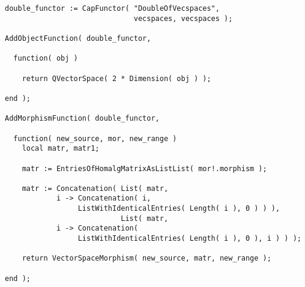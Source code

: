 \begin{small}
\begin{Verbatim}[frame=single]
double_functor := CapFunctor( "DoubleOfVecspaces", 
                              vecspaces, vecspaces );

AddObjectFunction( double_functor,
                   
  function( obj )
    
    return QVectorSpace( 2 * Dimension( obj ) );
    
end );

AddMorphismFunction( double_functor,
                     
  function( new_source, mor, new_range )
    local matr, matr1;
    
    matr := EntriesOfHomalgMatrixAsListList( mor!.morphism );
    
    matr := Concatenation( List( matr,
            i -> Concatenation( i,
                 ListWithIdenticalEntries( Length( i ), 0 ) ) ),
                           List( matr,
            i -> Concatenation(
                 ListWithIdenticalEntries( Length( i ), 0 ), i ) ) );
    
    return VectorSpaceMorphism( new_source, matr, new_range );
    
end );
\end{Verbatim}
\end{small}